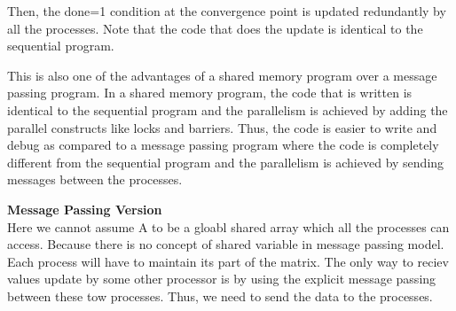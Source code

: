 \documentclass[12pt]{article}
\begin{document}
Then, the done=1 condition at the convergence point is updated redundantly by all the processes.
Note that the code that does the update is identical to the sequential program.

This is also one of the advantages of a shared memory program over a message passing program.
In a shared memory program, the code that is written is identical to the sequential program and the parallelism is achieved by adding the parallel constructs like locks and barriers.
Thus, the code is easier to write and debug as compared to a message passing program where the code is completely different from the sequential program and the parallelism is achieved by sending messages between the processes.

\textbf{Message Passing Version}\\
Here we cannot assume A to be a gloabl shared array which all the processes can access.
Because there is no concept of shared variable in message passing model. Each process will have to maintain its part of the matrix.
The only way to reciev values update by some other processor is by using the explicit message passing between these tow processes.
Thus, we need to send the data to the processes.
\end{document}
